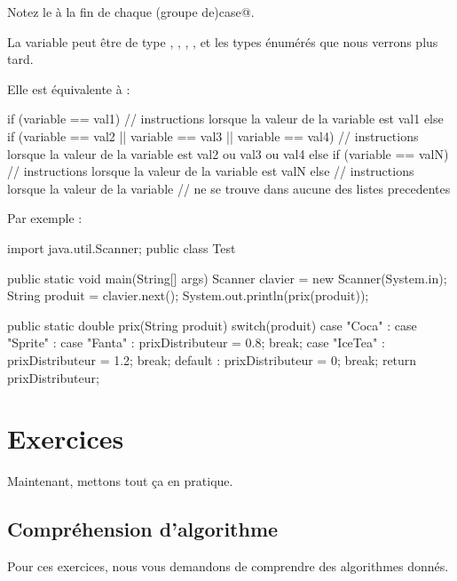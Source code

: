 \documentclass[11pt,a4paper]{article}
\begin{document}
        Notez le \verb@break@ \`a la fin de chaque (groupe de)\verb@ case@.
      
            \par
        
        La variable peut \^etre de type \verb@byte@, \verb@short@, 
        \verb@char@, \verb@int@, \verb@String@ et 
        les types \'enum\'er\'es que nous verrons plus tard.
      
            \par
        
        Elle est \'equivalente \`a : 
      
            \par
        \begin{Java}
if (variable == val1){
      // instructions lorsque la valeur de la variable est val1
} else if (variable ==  val2 || variable ==  val3 || variable == val4){
      // instructions lorsque la valeur de la variable est val2 ou val3 ou val4
} else if (variable == valN){
      // instructions lorsque la valeur de la variable est valN
} else {
      // instructions lorsque la valeur de la variable
      // ne se trouve dans aucune des listes precedentes
}      \end{Java}Par exemple : 
            \par
        \begin{Java}
import java.util.Scanner;
public class Test{
  public static void main(String[] args){
      Scanner clavier = new Scanner(System.in);
      String produit = clavier.next();
      System.out.println(prix(produit));
  }
  
  public static double prix(String produit){
      switch(produit) {
        case "Coca" :
        case "Sprite" :
        case "Fanta" :
        prixDistributeur = 0.8;
        break;
      case "IceTea" :
        prixDistributeur = 1.2;
        break;
      default :
        prixDistributeur = 0;
        break;
      }
      return prixDistributeur;
    }
}
      \end{Java}\section{Exercices}
				Maintenant, mettons tout \c ca en pratique.
      
            \par
        \subsection{Compr\'ehension d'algorithme}
          Pour ces exercices, nous vous demandons de comprendre des algorithmes donn\'es. 
          
\end{document}
